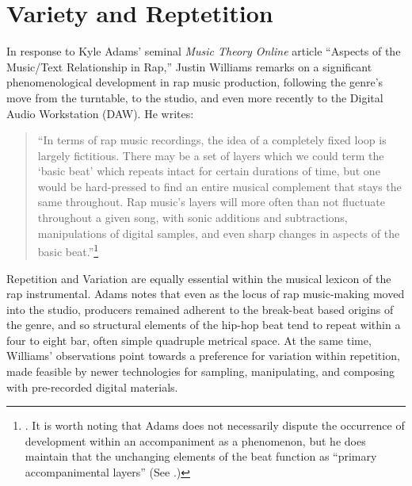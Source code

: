 \label{chapter2}
\section{Variety and Reptetition}
In response to Kyle Adams' seminal \textit{Music Theory Online} article ``Aspects of the Music/Text Relationship in Rap,'' Justin Williams remarks on a significant phenomenological development in rap music production, following the genre's move from the turntable, to the studio, and even more recently to the Digital Audio Workstation (DAW). He writes:

\begin{quote}
    \small ``In terms of rap music recordings, the idea of a completely fixed loop is largely fictitious. There may be a set of layers which we could term the `basic beat' which repeats intact for certain durations of time, but one would be hard-pressed to find an entire musical complement that stays the same throughout. Rap music’s layers will more often than not fluctuate throughout a given song, with sonic additions and subtractions, manipulations of digital samples, and even sharp changes in aspects of the basic beat.''\footnote{\cite{justinawilliamsBeatsFlowsResponse2009}. It is worth noting that Adams does not necessarily dispute the occurrence of development within an accompaniment as a phenomenon, but he does maintain that the unchanging elements of the beat function as ``primary accompanimental layers'' (See \cite{kyleadamsPeopleInstinctiveAssumptions2009}.)}
\end{quote}

\noindent \normalsize Repetition and Variation are equally essential within the musical lexicon of the rap instrumental. Adams notes that even as the locus of rap music-making moved into the studio, producers remained adherent to the break-beat based origins of the genre, and so structural elements of the hip-hop beat tend to repeat within a four to eight bar, often simple quadruple metrical space. At the same time, Williams' observations point towards a preference for variation within repetition, made feasible by newer technologies for sampling, manipulating, and composing with pre-recorded digital materials.

